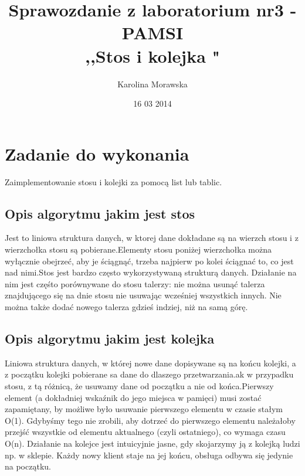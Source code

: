\documentclass[11pt]{article}
\begin{document}
 \begin{titlepage} 
\title{ Sprawozdanie z laboratorium nr3 -PAMSI
\\ ,,Stos i kolejka "} 
\author{Karolina Morawska}
 \date{16 03 2014}
 \maketitle 
\end{titlepage}

\tableofcontents
 \section{Zadanie do wykonania} 
Zaimplementowanie stosu i kolejki za pomocą list lub tablic.
\subsection{Opis algorytmu jakim jest stos}
Jest to liniowa struktura danych, w ktorej dane dokładane są na wierzch stosu i z wierzchołka stosu są pobierane.Elementy stosu poniżej wierzchołka można wyłącznie obejrzeć, aby je ściągnąć, trzeba najpierw po kolei ściągnać to, co jest nad nimi.Stos jest bardzo często wykorzystywaną strukturą danych. Działanie na nim jest częśto porównywane do stosu talerzy: nie można usunąć talerza znajdującego się na dnie stosu nie usuwając wcześniej wszystkich innych. Nie można także dodać nowego talerza gdzieś indziej, niż na samą górę.

\subsection{Opis algorytmu jakim jest kolejka }
Liniowa struktura danych, w której nowe dane dopisywane są na końcu kolejki, a z początku kolejki pobierane sa dane do dlaszego przetwarzania.ak w przypadku stosu, z tą różnicą, że usuwamy dane od początku a nie od końca.Pierwszy element (a dokładniej wskaźnik do jego miejsca w pamięci) musi zostać zapamiętany, by możliwe było usuwanie pierwszego elementu w czasie stałym O(1). Gdybyśmy tego nie zrobili, aby dotrzeć do pierwszego elementu należałoby przejść wszystkie od elementu aktualnego (czyli ostatniego), co wymaga czasu O(n).
Działanie na kolejce jest intuicyjnie jasne, gdy skojarzymy ją z kolejką ludzi np. w sklepie. Każdy nowy klient staje na jej końcu, obsługa odbywa się jedynie na początku. 


\newpage
\end{document}
